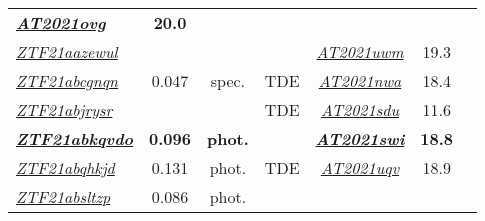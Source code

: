 \begin{table*}
\begin{tabular}{l  c  c  c   c  c  c}
    \textbf{\textit{\href{https://www.wis-tns.org/object/2021ovg}{AT2021ovg}}}                        & \textbf{20.0}  &                                                                                                                  \\
    \textit{\href{https://ztfnuclear.simeonreusch.com/transient/ZTF21aazewul}{ZTF21aazewul}}          & ~              & ~              & ~                       &
    \textit{\href{https://www.wis-tns.org/object/2021uwm}{AT2021uwm}}                                 & 19.3           &                                                                                                                  \\
    \textit{\href{https://ztfnuclear.simeonreusch.com/transient/ZTF21abcgnqn}{ZTF21abcgnqn}}          & 0.047          & spec.          & TDE                     &
    \textit{\href{https://www.wis-tns.org/object/2021nwa}{AT2021nwa}}                                 & 18.4           &                                                                                                                  \\
    \textit{\href{https://ztfnuclear.simeonreusch.com/transient/ZTF21abjrysr}{ZTF21abjrysr}}          & ~              & ~              & TDE                     &
    \textit{\href{https://www.wis-tns.org/object/2021sdu}{AT2021sdu}}                                 & 11.6           &                                                                                                                  \\
    \textbf{\textit{\href{https://ztfnuclear.simeonreusch.com/transient/ZTF21abkqvdo}{ZTF21abkqvdo}}} & \textbf{0.096} & \textbf{phot.} & ~                       &
    \textbf{\textit{\href{https://www.wis-tns.org/object/2021swi}{AT2021swi}}}                        & \textbf{18.8}  &                                                                                                                  \\
    \textit{\href{https://ztfnuclear.simeonreusch.com/transient/ZTF21abqhkjd}{ZTF21abqhkjd}}          & 0.131          & phot.          & TDE                     &
    \textit{\href{https://www.wis-tns.org/object/2021uqv}{AT2021uqv}}                                 & 18.9           &                                                                                                                  \\
    \textit{\href{https://ztfnuclear.simeonreusch.com/transient/ZTF21absltzp}{ZTF21absltzp}}          & 0.086          & phot.          & ~                       &

\end{tabular}
\end{table*}
